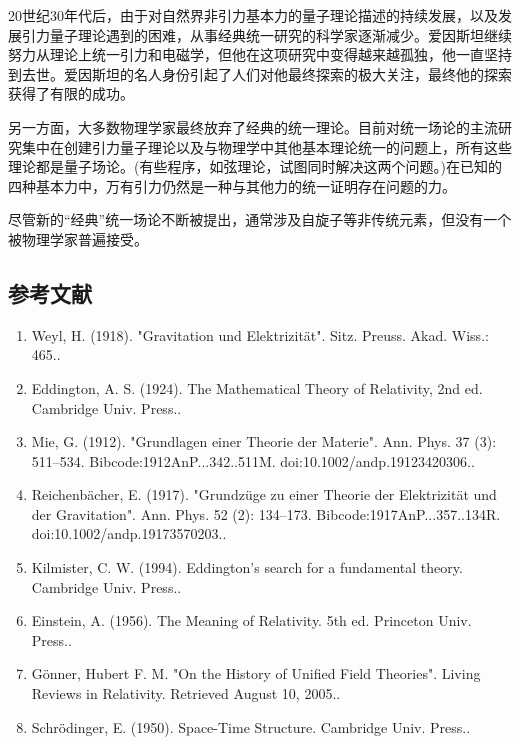 20世纪30年代后，由于对自然界非引力基本力的量子理论描述的持续发展，以及发展引力量子理论遇到的困难，从事经典统一研究的科学家逐渐减少。爱因斯坦继续努力从理论上统一引力和电磁学，但他在这项研究中变得越来越孤独，他一直坚持到去世。爱因斯坦的名人身份引起了人们对他最终探索的极大关注，最终他的探索获得了有限的成功。

另一方面，大多数物理学家最终放弃了经典的统一理论。目前对统一场论的主流研究集中在创建引力量子理论以及与物理学中其他基本理论统一的问题上，所有这些理论都是量子场论。(有些程序，如弦理论，试图同时解决这两个问题。)在已知的四种基本力中，万有引力仍然是一种与其他力的统一证明存在问题的力。

尽管新的“经典”统一场论不断被提出，通常涉及自旋子等非传统元素，但没有一个被物理学家普遍接受。

\subsection{参考文献}

\begin{enumerate}
\item Weyl, H. (1918). "Gravitation und Elektrizität". Sitz. Preuss. Akad. Wiss.: 465..
\item Eddington, A. S. (1924). The Mathematical Theory of Relativity, 2nd ed. Cambridge Univ. Press..
\item Mie, G. (1912). "Grundlagen einer Theorie der Materie". Ann. Phys. 37 (3): 511–534. Bibcode:1912AnP...342..511M. doi:10.1002/andp.19123420306..
\item Reichenbächer, E. (1917). "Grundzüge zu einer Theorie der Elektrizität und der Gravitation". Ann. Phys. 52 (2): 134–173. Bibcode:1917AnP...357..134R. doi:10.1002/andp.19173570203..
\item Kilmister, C. W. (1994). Eddington's search for a fundamental theory. Cambridge Univ. Press..
\item Einstein, A. (1956). The Meaning of Relativity. 5th ed. Princeton Univ. Press..
\item Gönner, Hubert F. M. "On the History of Unified Field Theories". Living Reviews in Relativity. Retrieved August 10, 2005..
\item Schrödinger, E. (1950). Space-Time Structure. Cambridge Univ. Press..
\end{enumerate}
